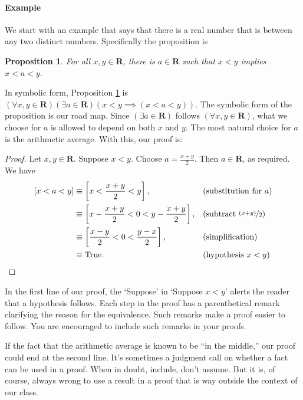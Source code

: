 \documentclass[12pt,fleqn]{article}
\newcommand{\reals}{\mathbf{R}}
\newcommand{\true}{\mathrm{True}}
\newenvironment{myproof}
  {\begin{shaded}\begin{proof}}
  {\end{proof}\end{shaded}}
\newtheorem{prop}{Proposition}
\newcounter{ex}\setcounter{ex}{0}
\newcommand{\ex}{%
\setcounter{ex}{\value{ex}+1}
\paragraph{Example \theex}}
\begin{document}
\ex We start with an example that says that there is a 
real number that is between any two distinct numbers. Specifically
the proposition is
\begin{prop}
  For all $x,y \in \reals$, there is $a \in \reals$ such that
    $x < y$ implies $x<a<y$. \label{p1}   
\end{prop}
In symbolic form, Proposition \ref{p1} is
$\left(\forall x,y \in \reals \right) 
 \left( \exists a \in \reals \right)
\left(  x < y \implies \left(x < a < y \right) \right)$.  The symbolic form 
of the proposition is our road map. Since $\left(\exists a \in \reals \right)$ follows 
$\left(\forall x,y \in \reals \right)$, what we choose for $a$ is allowed to 
depend on both $x$ and $y$. The most natural choice for $a$ is the
arithmetic average. With this, our proof is:
\begin{myproof}
    Let $x,y \in \reals$. Suppose $x < y$. Choose $a = \frac{x+y}{2}$.
    Then $a \in \reals$, as required. We have
    \begin{align*}
      \left[ x < a < y \right] 
          &\equiv \left[ x < \frac{x+y}{2} < y \right], &&\text{(substitution for $a$)} \\
          & \equiv \left[ x - \frac{x+y}{2} < 0 < y - \frac{x+y}{2}  \right], &&\text{(subtract $\nicefrac{(x+y)}{2}$)} \\
          & \equiv \left[ \frac{x-y}{2} < 0 < \frac{y-x}{2}  \right], &&\text{(simplification)} \\
          & \equiv \true. && \text{(hypothesis $x < y$)} \qedhere
    \end{align*} 
\end{myproof}
In the first line of our proof, the `Suppose' in  `Suppose $x < y$' alerts the reader that a hypothesis follows.
Each step in the proof has a parenthetical remark clarifying the reason for the equivalence. Such remarks make 
a proof easier to follow.  You are encouraged to include such remarks in your proofs.

If the fact that the arithmetic average is known to be ``in the middle,'' our proof could end at 
the second line. It's sometimes a judgment call on whether a fact can be used in a proof. When in doubt, include, don't assume.
But it is, of course, always wrong to use a result in a proof  that is way outside the context of our class.
\end{document}
